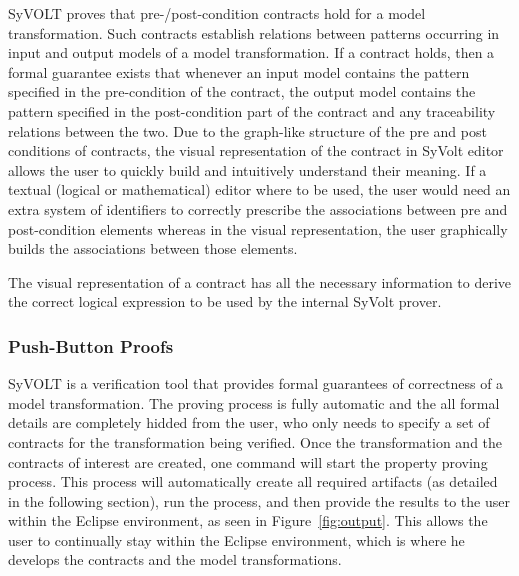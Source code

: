  SyVOLT
proves that pre-/post-condition contracts hold for a model transformation. Such
contracts establish relations between patterns occurring in input and output
models of a model transformation. If a contract holds, then a formal guarantee
exists that whenever an input model contains the pattern specified in the
pre-condition of the contract, the output model contains the pattern specified
in the post-condition part of the contract and any traceability relations
between the two.
Due to the graph-like structure of the pre and post conditions of contracts, the
visual representation of the contract in SyVolt editor allows the user to
quickly build and intuitively understand their meaning.
If a textual (logical or mathematical) editor where to be used, the user would
need an extra system of identifiers to correctly prescribe the associations
between pre and post-condition elements whereas in the visual representation,
the user graphically builds the associations between those elements.

The visual representation of a contract has all the necessary information to
derive the correct logical expression to be used by the internal SyVolt prover.

\subsubsection{Push-Button Proofs}
\label{sec:push_button_proofs}

SyVOLT is a verification tool that provides formal guarantees of correctness of
a model transformation. The
proving process is fully automatic and the all formal details are completely
hidded from the user, who only needs to specify a set of contracts for the
transformation being verified. Once the transformation and the contracts of
interest are created, one command will start the property proving process. This
process will automatically create all required artifacts (as detailed in the
following section), run the process, and then provide the results to the user
within the Eclipse environment, as seen in Figure~\ref{fig:output}. This allows
the user to continually stay within the Eclipse environment, which is where he
develops the contracts and the model transformations.


